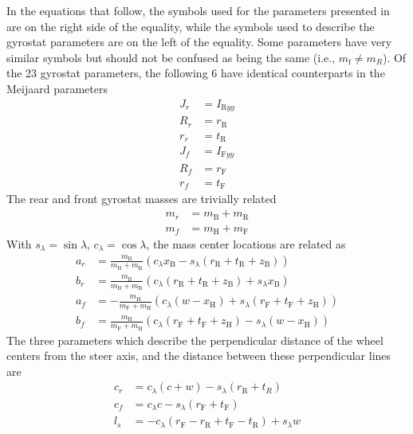 In the equations that follow, the symbols used for the parameters presented
in~\cite{Meijaard2007} are on the right side of the equality, while the symbols
used to describe the gyrostat parameters are on the left of the equality. Some
parameters have very similar symbols but should not be confused as being the
same (i.e., $m_\text{f} \ne m_R$). Of the 23 gyrostat parameters, the following
6 have identical counterparts in the Meijaard parameters
\begin{align}
  J_r &= I_{\text{R}yy} \\
  R_r &= r_\text{R} \\
  r_r &= t_\text{R}\\
  J_f &= I_{\text{F}yy} \\
  R_f &= r_\text{F} \\
  r_f &= t_\text{F}
\end{align}
The rear and front gyrostat masses are trivially related
\begin{align}
  m_r &= m_\text{B} + m_\text{R} \\
  m_f &= m_\text{H} + m_\text{F}
\end{align}
With $s_\lambda=\sin\lambda$, $c_\lambda=\cos\lambda$, the mass center locations are related as
\begin{align}
a_r &= \frac{m_\text{B}}{m_\text{B} + m_\text{R}} \left(c_{\lambda} x_\text{B}
- s_{\lambda} \left(r_\text{R} + t_\text{R} + z_\text{B}\right)\right) \\
b_r &= \frac{m_\text{B}}{m_\text{B} + m_\text{R}} \left(c_{\lambda}
\left(r_\text{R} + t_\text{R} + z_\text{B}\right) + s_{\lambda} x_\text{B}\right) \\
a_f &= - \frac{m_\text{H}}{m_\text{F} + m_\text{H}} \left(c_{\lambda} \left(w -
x_\text{H}\right) + s_{\lambda} \left(r_\text{F} + t_\text{F} + z_\text{H}\right)\right) \\
b_f &= \frac{m_\text{H}}{m_\text{F} + m_\text{H}} \left(c_{\lambda}
\left(r_\text{F} + t_\text{F} + z_\text{H}\right) - s_{\lambda} \left(w -
x_\text{H}\right)\right)
\end{align}
The three parameters which describe the perpendicular distance of the wheel centers from the
steer axis, and the distance between these perpendicular lines are
\begin{align}
c_r &= c_{\lambda} \left(c + w\right) - s_{\lambda} \left(r_\text{R} +
t_{R}\right) \\
c_f &= c_{\lambda} c - s_{\lambda} \left(r_\text{F} + t_\text{F}\right) \\
l_s &= - c_{\lambda} \left(r_\text{F} - r_\text{R} + t_\text{F} - t_\text{R}\right) + s_{\lambda} w
\end{align}
